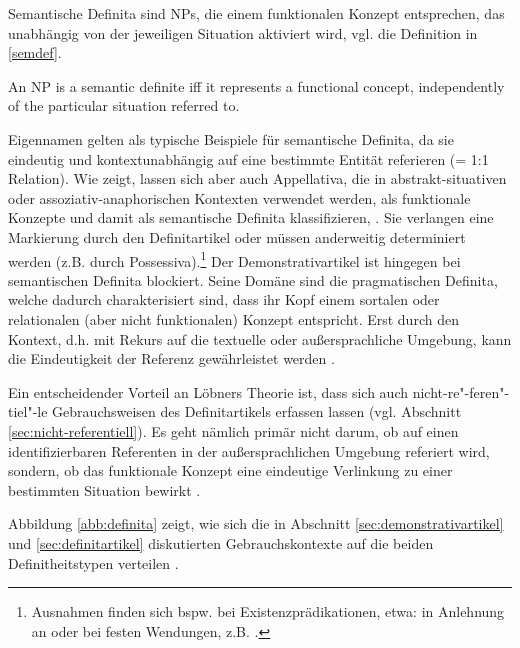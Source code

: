 Semantische Definita sind NPs, die einem funktionalen Konzept entsprechen, das unabhängig von der jeweiligen Situation aktiviert wird, vgl. die Definition in \ref{semdef}. 

\begin{exe}
	\ex \label{semdef}  An NP is a semantic definite iff it represents a functional concept, independently of the particular situation referred to. \parencite[299]{Lobner1985}
\end{exe}

Eigennamen gelten als typische Beispiele für semantische Definita, da sie eindeutig und kontextunabhängig auf eine bestimmte Entität referieren (= 1:1 Relation). Wie \textcite[299-307]{Lobner1985} zeigt, lassen sich aber auch Appellativa, die in abstrakt-situativen oder assoziativ-anaphorischen Kontexten verwendet werden, als funktionale Konzepte und damit als semantische Definita klassifizieren, \parencite[s. hierzu auch ausführlich][104-110]{Demske2001}. Sie verlangen eine Markierung durch den Definitartikel oder müssen anderweitig determiniert werden (z.B. durch Possessiva).\footnote{Ausnahmen finden sich bspw. bei Existenzprädikationen, etwa:  in Anlehnung an \textcite[297]{Lobner1985} oder bei festen Wendungen, z.B.  \parencite[311]{Lobner1985}.}
Der Demonstrativartikel ist hingegen bei semantischen Definita blockiert. Seine Domäne sind die pragmatischen Definita, welche dadurch charakterisiert sind, dass ihr Kopf einem sortalen oder relationalen (aber nicht funktionalen) Konzept entspricht. Erst durch den Kontext, d.h. mit Rekurs auf die textuelle oder außersprachliche Umgebung, kann die Eindeutigkeit der Referenz gewährleistet werden \parencite[307]{Lobner1985}. 

Ein entscheidender Vorteil an Löbners Theorie ist, dass sich auch nicht-re"-feren"-tiel"-le Gebrauchsweisen des Definitartikels erfassen lassen (vgl. Abschnitt \ref{sec:nicht-referentiell}). Es geht nämlich primär nicht darum, ob auf einen  identifizierbaren Referenten in der außersprachlichen Umgebung referiert wird, sondern, ob das funktionale Konzept eine eindeutige Verlinkung zu einer bestimmten Situation bewirkt \parencite[304ff.]{Lobner1985}. 


Abbildung \ref{abb:definita} zeigt, wie sich die in Abschnitt \ref{sec:demonstrativartikel} und \ref{sec:definitartikel} diskutierten Gebrauchskontexte auf die beiden Definitheitstypen verteilen \parencite[angelehnt an und erweitert nach][71ff.]{Szczepaniak2011a}. 

